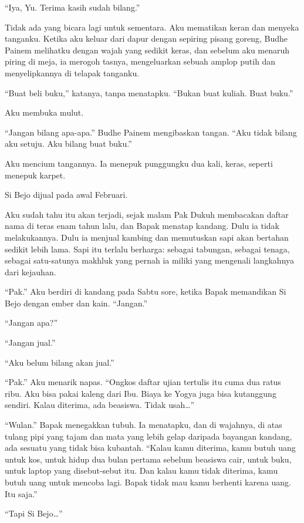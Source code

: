 \documentclass[11pt,twoside,openany]{book}
\makeatletter
\newcommand{\scenebreak}{\par\vspace{0.9em}{\centering\textsc{*\hspace{0.7em}*\hspace{0.7em}*}\par}\vspace{0.9em}\@afterindentfalse\@afterheading}
\makeatother
\begin{document}
``Iya, Yu. Terima kasih sudah bilang.''

Tidak ada yang bicara lagi untuk sementara. Aku mematikan keran dan menyeka tanganku. Ketika aku keluar dari dapur dengan sepiring pisang goreng, Budhe Painem melihatku dengan wajah yang sedikit keras, dan sebelum aku menaruh piring di meja, ia merogoh tasnya, mengeluarkan sebuah amplop putih dan menyelipkannya di telapak tanganku.

``Buat beli buku,'' katanya, tanpa menatapku. ``Bukan buat kuliah. Buat buku.''

Aku membuka mulut.

``Jangan bilang apa-apa.'' Budhe Painem mengibaskan tangan. ``Aku tidak bilang aku setuju. Aku bilang buat buku.''

Aku mencium tangannya. Ia menepuk punggungku dua kali, keras, seperti menepuk karpet.

\scenebreak
Si Bejo dijual pada awal Februari.

Aku sudah tahu itu akan terjadi, sejak malam Pak Dukuh membacakan daftar nama di teras enam tahun lalu, dan Bapak menatap kandang. Dulu ia tidak melakukannya. Dulu ia menjual kambing dan memutuskan sapi akan bertahan sedikit lebih lama. Sapi itu terlalu berharga: sebagai tabungan, sebagai tenaga, sebagai satu-satunya makhluk yang pernah ia miliki yang mengenali langkahnya dari kejauhan.

``Pak.'' Aku berdiri di kandang pada Sabtu sore, ketika Bapak memandikan Si Bejo dengan ember dan kain. ``Jangan.''

``Jangan apa?''

``Jangan jual.''

``Aku belum bilang akan jual.''

``Pak.'' Aku menarik napas. ``Ongkos daftar ujian tertulis itu cuma dua ratus ribu. Aku bisa pakai kaleng dari Ibu. Biaya ke Yogya juga bisa kutanggung sendiri. Kalau diterima, ada beasiswa. Tidak usah\ldots{}''

``Wulan.'' Bapak menegakkan tubuh. Ia menatapku, dan di wajahnya, di atas tulang pipi yang tajam dan mata yang lebih gelap daripada bayangan kandang, ada sesuatu yang tidak bisa kubantah. ``Kalau kamu diterima, kamu butuh uang untuk kos, untuk hidup dua bulan pertama sebelum beasiswa cair, untuk buku, untuk laptop yang disebut-sebut itu. Dan kalau kamu tidak diterima, kamu butuh uang untuk mencoba lagi. Bapak tidak mau kamu berhenti karena uang. Itu saja.''

``Tapi Si Bejo\ldots{}''
\end{document}

